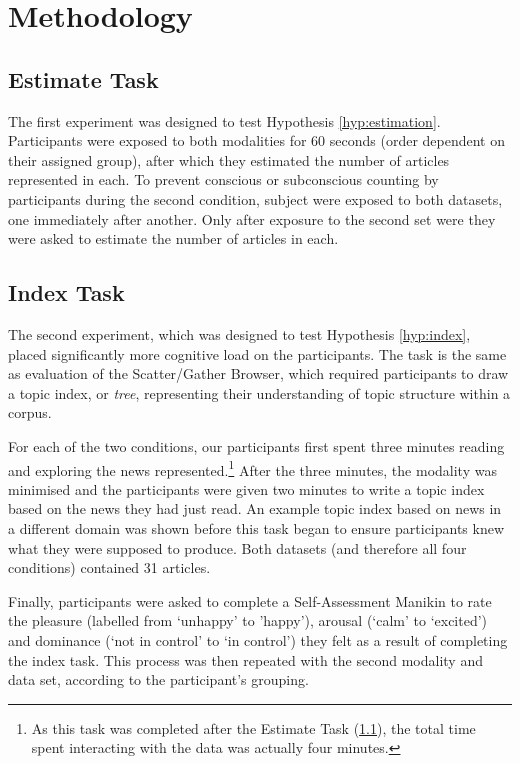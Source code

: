 \section{Methodology}

\subsection{Estimate Task} \label{task:est}

The first experiment was designed to test Hypothesis \ref{hyp:estimation}. Participants were exposed to both modalities for 60 seconds (order dependent on their assigned group), after which they estimated the number of articles represented in each. To prevent conscious or subconscious counting by participants during the second condition, subject were exposed to both datasets, one immediately after another. Only after exposure to the second set were they were asked to estimate the number of articles in each.

\subsection{Index Task}

The second experiment, which was designed to test Hypothesis \ref{hyp:index}, placed significantly more cognitive load on the participants. The task is the same as  evaluation of the Scatter/Gather Browser, which required participants to draw a topic index, or \textit{tree}, representing their understanding of topic structure within a corpus.

For each of the two conditions, our participants first spent three minutes reading and exploring the news represented.\footnote{As this task was completed after the Estimate Task (\ref{task:est}), the total time spent interacting with the data was actually four minutes.} After the three minutes, the modality was minimised and the participants were given two minutes to write a topic index based on the news they had just read. An example topic index based on news in a different domain was shown before this task began to ensure participants knew what they were supposed to produce. Both datasets (and therefore all four conditions) contained 31 articles.

Finally, participants were asked to complete a Self-Assessment Manikin \citep{measuringemotion} to rate the pleasure (labelled from `unhappy' to 'happy'), arousal (`calm' to `excited') and dominance (`not in control' to `in control') they felt as a result of completing the index task. This process was then repeated with the second modality and data set, according to the participant's grouping.

